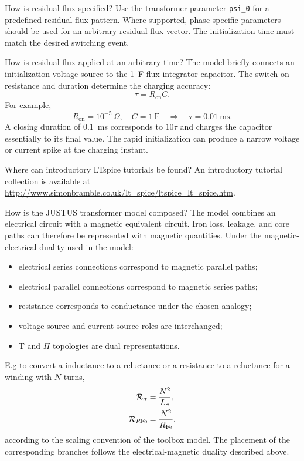 \begin{formulaBox}{How is residual flux specified?}
Use the transformer parameter \texttt{psi\_0} for a predefined residual-flux
pattern. Where supported, phase-specific parameters should be used for an
arbitrary residual-flux vector. The initialization time must match the desired
switching event.
\end{formulaBox}

\begin{formulaBox}{How is residual flux applied at an arbitrary time?}
The model briefly connects an initialization voltage source to the
\SI{1}{\farad} flux-integrator capacitor. The switch on-resistance and duration
determine the charging accuracy:
\begin{equation}
\tau=R_{\mathrm{on}}C.
\end{equation}
For example,
\begin{equation}
R_{\mathrm{on}}=10^{-5}\,\Omega,\quad C=\SI{1}{\farad}
\quad\Longrightarrow\quad
\tau=\SI{0.01}{\milli\second}.
\end{equation}
A closing duration of \SI{0.1}{\milli\second} corresponds to $10\tau$ and
charges the capacitor essentially to its final value. The rapid initialization
can produce a narrow voltage or current spike at the charging instant.
\end{formulaBox}

\begin{formulaBox}{Where can introductory LTspice tutorials be found?}
An introductory tutorial collection is available at
\url{http://www.simonbramble.co.uk/lt_spice/ltspice_lt_spice.htm}.
\end{formulaBox}

\begin{formulaBox}{How is the JUSTUS transformer model composed?}
The model combines an electrical circuit with a magnetic equivalent circuit.
Iron loss, leakage, and core paths can therefore be represented with magnetic
quantities. Under the magnetic-electrical duality used in the model:
\begin{itemize}
\item electrical series connections correspond to magnetic parallel paths;
\item electrical parallel connections correspond to magnetic series paths;
\item resistance corresponds to conductance under the chosen analogy;
\item voltage-source and current-source roles are interchanged;
\item T and $\Pi$ topologies are dual representations.
\end{itemize}

E.g to convert a inductance to a reluctance or a resistance to a reluctance for a winding with $N$ turns,
\begin{align}
\mathcal{R}_\sigma&=\frac{N^2}{L_\sigma},\\
\mathcal{R}_{R\mathrm{Fe}}&=\frac{N^2}{R_{\mathrm{Fe}}},
\end{align}
according to the scaling convention of the toolbox model. The placement of the
corresponding branches follows the electrical-magnetic duality described above.
\end{formulaBox}


